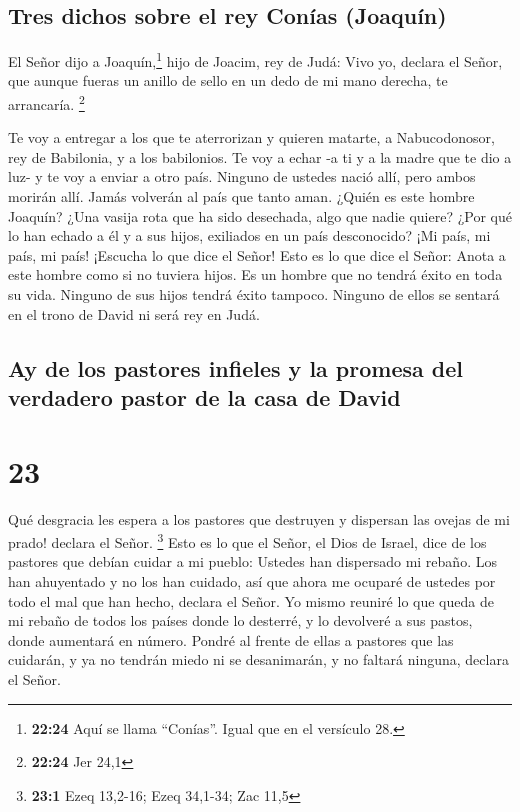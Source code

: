 \hypertarget{tres-dichos-sobre-el-rey-conuxedas-joaquuxedn}{%
\subsection{Tres dichos sobre el rey Conías
(Joaquín)}\label{tres-dichos-sobre-el-rey-conuxedas-joaquuxedn}}

 El Señor dijo a Joaquín,\footnote{\textbf{22:24} Aquí se
  llama ``Conías''. Igual que en el versículo 28.} hijo de Joacim, rey
de Judá: Vivo yo, declara el Señor, que aunque fueras un anillo de sello
en un dedo de mi mano derecha, te arrancaría. \footnote{\textbf{22:24}
  Jer 24,1}

 Te voy a entregar a los que te aterrorizan y quieren
matarte, a Nabucodonosor, rey de Babilonia, y a los babilonios.
 Te voy a echar -a ti y a la madre que te dio a luz- y te
voy a enviar a otro país. Ninguno de ustedes nació allí, pero ambos
morirán allí.  Jamás volverán al país que tanto aman.
 ¿Quién es este hombre Joaquín? ¿Una vasija rota que ha
sido desechada, algo que nadie quiere? ¿Por qué lo han echado a él y a
sus hijos, exiliados en un país desconocido?  ¡Mi país,
mi país, mi país! ¡Escucha lo que dice el Señor!  Esto es
lo que dice el Señor: Anota a este hombre como si no tuviera hijos. Es
un hombre que no tendrá éxito en toda su vida. Ninguno de sus hijos
tendrá éxito tampoco. Ninguno de ellos se sentará en el trono de David
ni será rey en Judá.

\hypertarget{ay-de-los-pastores-infieles-y-la-promesa-del-verdadero-pastor-de-la-casa-de-david}{%
\subsection{Ay de los pastores infieles y la promesa del verdadero
pastor de la casa de
David}\label{ay-de-los-pastores-infieles-y-la-promesa-del-verdadero-pastor-de-la-casa-de-david}}

\hypertarget{section-22}{%
\section{23}\label{section-22}}

 Qué desgracia les espera a los pastores que destruyen y
dispersan las ovejas de mi prado! declara el Señor. \footnote{\textbf{23:1}
  Ezeq 13,2-16; Ezeq 34,1-34; Zac 11,5}  Esto es lo que el
Señor, el Dios de Israel, dice de los pastores que debían cuidar a mi
pueblo: Ustedes han dispersado mi rebaño. Los han ahuyentado y no los
han cuidado, así que ahora me ocuparé de ustedes por todo el mal que han
hecho, declara el Señor.  Yo mismo reuniré lo que queda de
mi rebaño de todos los países donde lo desterré, y lo devolveré a sus
pastos, donde aumentará en número.  Pondré al frente de
ellas a pastores que las cuidarán, y ya no tendrán miedo ni se
desanimarán, y no faltará ninguna, declara el Señor.

